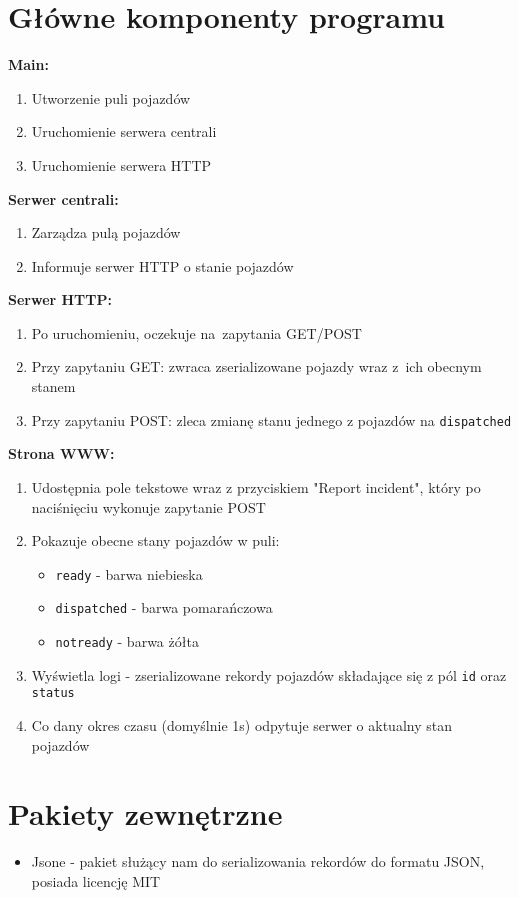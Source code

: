 \documentclass{article}
\begin{document}
\section{Główne komponenty programu}
\textbf{Main:}
\begin{enumerate}
	\item Utworzenie puli pojazdów
	\item Uruchomienie serwera centrali
	\item Uruchomienie serwera HTTP
\end{enumerate}

\textbf{Serwer centrali:}
\begin{enumerate}
	\item Zarządza pulą pojazdów
	\item Informuje serwer HTTP o stanie pojazdów
\end{enumerate}

\textbf{Serwer HTTP:}
\begin{enumerate}
	\item Po uruchomieniu, oczekuje na~zapytania GET/POST
	\item Przy zapytaniu GET: zwraca zserializowane pojazdy wraz z~ich obecnym stanem
	\item Przy zapytaniu POST: zleca zmianę stanu jednego z pojazdów na \texttt{dispatched}
\end{enumerate}

\textbf{Strona WWW:}
\begin{enumerate}
	\item Udostępnia pole tekstowe wraz z przyciskiem "Report incident", który po naciśnięciu wykonuje zapytanie POST
	\item Pokazuje obecne stany pojazdów w puli:
		\begin{itemize}
			\item \texttt{ready} - barwa niebieska
			\item \texttt{dispatched} - barwa pomarańczowa
			\item \texttt{notready} - barwa żółta
		\end{itemize}
	\item Wyświetla logi - zserializowane rekordy pojazdów składające się z pól \texttt{id} oraz \texttt{status}
	\item Co dany okres czasu (domyślnie 1s) odpytuje serwer o aktualny stan pojazdów
\end{enumerate}

\section{Pakiety zewnętrzne}
\begin{itemize}
	\item Jsone - pakiet służący nam do serializowania rekordów do formatu JSON, posiada licencję MIT
\end{itemize}
\end{document}
